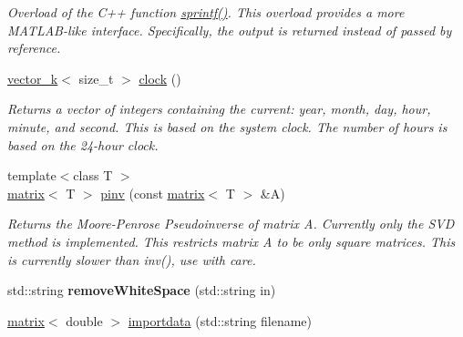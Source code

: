 \begin{DoxyCompactItemize}
\begin{DoxyCompactList}\small\item\em Overload of the C++ function \hyperlink{namespacekeycpp_a9d70a761d33bbc2bdec6b4e0eb43d517}{sprintf()}. This overload provides a more M\-A\-T\-L\-A\-B-\/like interface. Specifically, the output is returned instead of passed by reference. \end{DoxyCompactList}\item 
\hypertarget{namespacekeycpp_a806f0afebdf1131be26a05d7a4a23044}{\hyperlink{classkeycpp_1_1vector__k}{vector\-\_\-k}$<$ size\-\_\-t $>$ \hyperlink{namespacekeycpp_a806f0afebdf1131be26a05d7a4a23044}{clock} ()}\label{namespacekeycpp_a806f0afebdf1131be26a05d7a4a23044}

\begin{DoxyCompactList}\small\item\em Returns a vector of integers containing the current\-: year, month, day, hour, minute, and second. This is based on the system clock. The number of hours is based on the 24-\/hour clock. \end{DoxyCompactList}\item 
\hypertarget{namespacekeycpp_ac20bd2ef4fb18cbcdb0f462a89447bd7}{{\footnotesize template$<$class T $>$ }\\\hyperlink{classkeycpp_1_1matrix}{matrix}$<$ T $>$ \hyperlink{namespacekeycpp_ac20bd2ef4fb18cbcdb0f462a89447bd7}{pinv} (const \hyperlink{classkeycpp_1_1matrix}{matrix}$<$ T $>$ \&A)}\label{namespacekeycpp_ac20bd2ef4fb18cbcdb0f462a89447bd7}

\begin{DoxyCompactList}\small\item\em Returns the Moore-\/\-Penrose Pseudoinverse of matrix A. Currently only the S\-V\-D method is implemented. This restricts matrix A to be only square matrices. This is currently slower than inv(), use with care. \end{DoxyCompactList}\item 
\hypertarget{namespacekeycpp_ad70d9156c4b6a75e5b7a4c799f900162}{std\-::string {\bfseries remove\-White\-Space} (std\-::string in)}\label{namespacekeycpp_ad70d9156c4b6a75e5b7a4c799f900162}

\item 
\hypertarget{namespacekeycpp_ac5c0a8bc58229a412ec2068979b6b84e}{\hyperlink{classkeycpp_1_1matrix}{matrix}$<$ double $>$ \hyperlink{namespacekeycpp_ac5c0a8bc58229a412ec2068979b6b84e}{importdata} (std\-::string filename)}\label{namespacekeycpp_ac5c0a8bc58229a412ec2068979b6b84e}


\end{DoxyCompactItemize}
